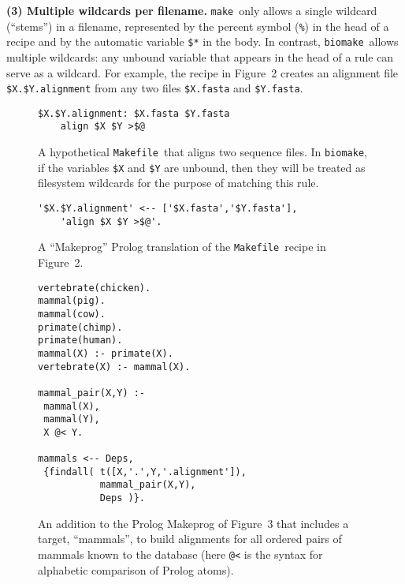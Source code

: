 \documentclass{bioinfo}
\newcommand\make{{\tt make}}
\newcommand\Makefile{{\tt Makefile}}
\newcommand\biomake{{\tt biomake}}
\begin{document}
{\bf (3) Multiple wildcards per filename.}
\make\ only allows a single wildcard (``stems'') in a filename,
represented by the percent symbol ({\tt \%}) in the head of a recipe and by the automatic variable {\tt \$*} in the body.
In contrast, \biomake\ allows multiple wildcards: any unbound variable that appears in the head of a rule can serve as a wildcard.
For example, the recipe in Figure~2 creates an alignment file {\tt \$X.\$Y.alignment} from any two files {\tt \$X.fasta} and {\tt \$Y.fasta}.

\begin{figure}
\begin{Verbatim}[frame=single]
$X.$Y.alignment: $X.fasta $Y.fasta
    align $X $Y >$@
\end{Verbatim}
\caption{
  A hypothetical \Makefile\ that aligns two sequence files.
  In \biomake, if the variables {\tt \$X} and {\tt \$Y} are unbound, then they will be treated as filesystem wildcards
  for the purpose of matching this rule.
}
\end{figure}

\begin{figure}
\begin{Verbatim}[frame=single]
'$X.$Y.alignment' <-- ['$X.fasta','$Y.fasta'],
    'align $X $Y >$@'.
\end{Verbatim}
\caption{
  A ``Makeprog'' Prolog translation of the \Makefile\ recipe in Figure~2.
}
\end{figure}

\begin{figure}
\begin{Verbatim}[frame=single]
vertebrate(chicken).
mammal(pig).
mammal(cow).
primate(chimp).
primate(human).
mammal(X) :- primate(X).
vertebrate(X) :- mammal(X).

mammal_pair(X,Y) :-
 mammal(X),
 mammal(Y),
 X @< Y.

mammals <-- Deps, 
 {findall( t([X,'.',Y,'.alignment']),
           mammal_pair(X,Y),
           Deps )}.
\end{Verbatim}
\caption{
  An addition to the Prolog Makeprog of Figure~3 that includes a target, ``mammals'', to build alignments
  for all ordered pairs of mammals known to the database (here {\tt @<} is the syntax for alphabetic comparison of Prolog atoms).
}
\end{figure}
\end{document}
